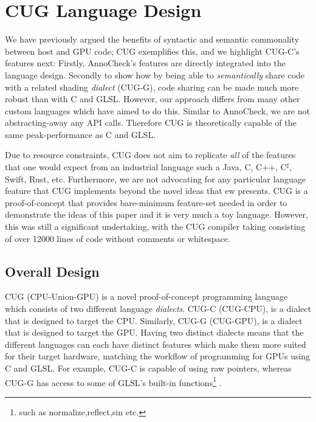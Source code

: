 \documentclass[a4paper,12pt,twoside,openright]{report}
\def\compilerloccount{12000 }
\begin{document}
\section{CUG Language Design}

\label{sec:design_languages}

We have previously argued the benefits of syntactic and semantic commonality
between host and GPU code; CUG exemplifies this, and we highlight CUG-C's
features next: Firstly, AnnoCheck's features are directly integrated into the
language design. Secondly to show how by being able to \textit{semantically}
share code with a related shading \textit{dialect} (CUG-G), code sharing can be
made much more robust than with C and GLSL. However, our approach differs from
many other custom languages which have aimed to do this. Similar to AnnoCheck,
we are not abstracting-away any API calls. Therefore CUG is theoretically
capable of the same peak-performance as C and GLSL.

Due to resource constraints, CUG does not aim to replicate \textit{all} of the
features that one would expect from an industrial language such a Java, C, C++,
C$^\sharp$, Swift, Rust, etc. Furthermore, we are not advocating for any
particular language feature that CUG implements beyond the novel ideas that ew
presents. CUG is a proof-of-concept that provides bare-minimum feature-set
needed in order to demonstrate the ideas of this paper and it is very much a
toy language. However, this was still a significant undertaking, with the CUG
compiler taking consisting of over \compilerloccount lines of code without
comments or whitespace.

\subsection{Overall Design}

CUG (CPU-Union-GPU) is a novel proof-of-concept programming language which
consists of two different language \textit{dialects}. CUG-C (CUG-CPU), is a
dialect that is designed to target the CPU. Similarly, CUG-G (CUG-GPU), is a
dialect that is designed to target the GPU. Having two distinct dialects means
that the different languages can each have distinct features which make them
more suited for their target hardware, matching the workflow of programming for
GPUs using C and GLSL. For example, CUG-C is capable of using raw pointers,
whereas CUG-G has access to some of GLSL's built-in functions\footnote{such as
normalize,reflect,sin etc.} \cite{GLSLBuiltIn}.
\end{document}
